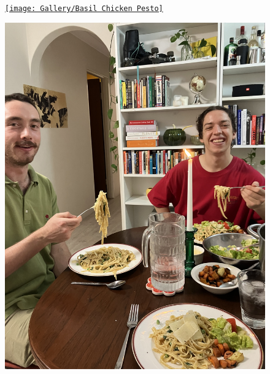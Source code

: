 \documentclass[]{article}
\begin{document}
\newpage\begin{figure}[H]
\begin{center}\hyperref[rec:Basil Chicken Pesto]{\texttt{[image: Gallery/Basil Chicken Pesto]}}\caption*{}\label{fig:Basil Chicken Pesto}\end{center}
\end{figure}
\newpage\begin{figure}[H]
\begin{center}\hyperref[rec:Fettuccine Alfredo]{\includegraphics[keepaspectratio,width=\textheight,height=\textwidth,angle=-90]{Gallery/Fettuccine Alfredo}}\caption*{}\label{fig:Fettuccine Alfredo}\end{center}
\end{figure}
\end{document}
